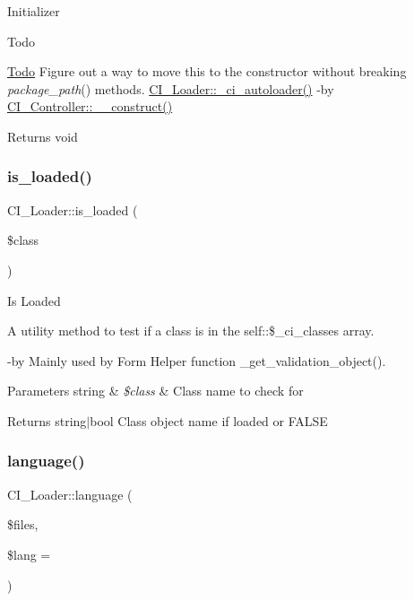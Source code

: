 Initializer

\begin{DoxyRefDesc}{Todo}
\item[\mbox{\hyperlink{todo__todo000001}{Todo}}]Figure out a way to move this to the constructor without breaking {\itshape package\+\_\+path}() methods.  \mbox{\hyperlink{class_c_i___loader_affd5b69b8d0f2883d89255967eba7129}{C\+I\+\_\+\+Loader\+::\+\_\+ci\+\_\+autoloader()}} -\/by \mbox{\hyperlink{class_c_i___controller_a3934262676ae6c34d3cbd4d1065efe20}{C\+I\+\_\+\+Controller\+::\+\_\+\+\_\+construct()}} \end{DoxyRefDesc}
\begin{DoxyReturn}{Returns}
void 
\end{DoxyReturn}
\mbox{\label{class_c_i___loader_acd71bb8962f4ac5cb330488c10aff7c2}} 
\subsubsection{\texorpdfstring{is\+\_\+loaded()}{is\_loaded()}}
{\footnotesize\ttfamily C\+I\+\_\+\+Loader\+::is\+\_\+loaded (\begin{DoxyParamCaption}\item[{}]{\$class }\end{DoxyParamCaption})}

Is Loaded

A utility method to test if a class is in the self\+::\$\+\_\+ci\+\_\+classes array.

-\/by Mainly used by Form Helper function \+\_\+get\+\_\+validation\+\_\+object().


\begin{DoxyParams}[1]{Parameters}
string & {\em \$class} & Class name to check for \\
\hline
\end{DoxyParams}
\begin{DoxyReturn}{Returns}
string$\vert$bool Class object name if loaded or F\+A\+L\+SE 
\end{DoxyReturn}
\mbox{\label{class_c_i___loader_a113081423f92eee712704dca59e0bba1}} 
\subsubsection{\texorpdfstring{language()}{language()}}
{\footnotesize\ttfamily C\+I\+\_\+\+Loader\+::language (\begin{DoxyParamCaption}\item[{}]{\$files,  }\item[{}]{\$lang = {\ttfamily \textquotesingle{}\textquotesingle{}} }\end{DoxyParamCaption})}

